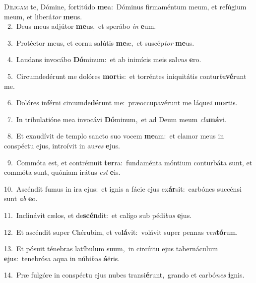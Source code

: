 \lettrine{\initial\textcolor{\initialcolor}{D}}{íligam} te, Dómine, fortitúdo \textbf{me}\-a:~\star Dóminus firmaméntum meum, et refúgium meum, et liberá\textit{tor} \textbf{me}\-us.\\
{\numbfont\textcolor{\numbcolor}{~2.}}~Deus meus adjútor \textbf{me}\-us,~\star et sperábo \textit{in} \textbf{e}\-um.\par
{\numbfont\textcolor{\numbcolor}{~3.}}~Protéctor meus, et cornu salútis \textbf{me}\-æ,~\star et suscép\textit{tor} \textbf{me}\-us.\par
{\numbfont\textcolor{\numbcolor}{~4.}}~Laudans invocábo \textbf{Dó}\-minum:~\star et ab inimícis meis sal\textit{vus} \textbf{e}\-ro.\par
{\numbfont\textcolor{\numbcolor}{~5.}}~Circumdedérunt me dolóres \textbf{mor}\-tis:~\star et torréntes iniquitátis contur\-\textit{ba}\-\textbf{vé}runt me.\par
{\numbfont\textcolor{\numbcolor}{~6.}}~Dolóres inférni circumde\-\textbf{dé}\-runt me:~\star præoccupavérunt me láque\textit{i} \textbf{mor}\-tis.\par
{\numbfont\textcolor{\numbcolor}{~7.}}~In tribulatióne mea invocávi \textbf{Dó}\-minum,~\star et ad Deum meum \textit{cla}\-\textbf{má}vi.\par
{\numbfont\textcolor{\numbcolor}{~8.}}~Et exaudívit de templo sancto suo vocem \textbf{me}\-am:~\star et clamor meus in conspéctu ejus, introívit in au\textit{res} \textbf{e}\-jus.\par
{\numbfont\textcolor{\numbcolor}{~9.}}~Commóta est, et contrémuit \textbf{ter}\-ra:~\star fundaménta móntium conturbáta sunt, et commóta sunt, quóniam irátus \textit{est} \textbf{e}\-is.\par
{\numbfont\textcolor{\numbcolor}{10.}}~Ascéndit fumus in ira ejus:~\dagger et ignis a fácie ejus ex\-\textbf{ár}\-sit:~\star carbónes succénsi sunt \textit{ab} \textbf{e}\-o.\par
{\numbfont\textcolor{\numbcolor}{11.}}~Inclinávit cælos, et de\-\textbf{scén}\-dit:~\star et calígo sub pédi\textit{bus} \textbf{e}\-jus.\par
{\numbfont\textcolor{\numbcolor}{12.}}~Et ascéndit super Chérubim, et vo\-\textbf{lá}\-vit:~\star volávit super pennas \textit{ven}\-\textbf{tó}rum.\par
{\numbfont\textcolor{\numbcolor}{13.}}~Et pósuit ténebras latíbulum suum,~\dagger in circúitu ejus tabernáculum \textbf{e}\-jus:~\star tenebrósa aqua in núbi\textit{bus} \textbf{á}\-ëris.\par
{\numbfont\textcolor{\numbcolor}{14.}}~Præ fulgóre in conspéctu ejus nubes transi\-\textbf{é}\-runt,~\star grando et carbó\textit{nes} \textbf{i}\-gnis.\par
